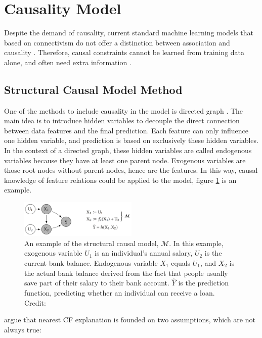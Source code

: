 \section{Causality Model}\label{sec:Causality}
Despite the demand of causality, current standard machine learning models that based on connectivism do not offer a distinction between association and causality \cite{diffThatMakesDiff}. Therefore, causal constraints cannot be learned from training data alone, and often need extra information \cite{bookCausality,preservingCausal}.
\subsection{Structural Causal Model Method}
One of the methods to include causality in the model is directed graph \cite{algorithmicrecourse}. The main idea is to introduce hidden variables to decouple the direct connection between data features and the final prediction. Each feature can only influence one hidden variable, and prediction is based on exclusively these hidden variables. In the context of a directed graph, these hidden variables are called endogenous variables because they have at least one parent node. Exogenous variables are those root nodes without parent nodes, hence are the features. In this way, causal knowledge of feature relations could be applied to the model, figure \ref{fig:directedGraph} is an example.
\begin{figure}
  \centering
  \includegraphics[width=0.5\textwidth]{directedGraph.PNG}
  \caption{An example of the structural causal model, $\mathcal{M}$. In this example, exogenous variable $U_1$ is an individual's annual salary, $U_2$ is the current bank balance. Endogenous variable $X_1$ equals $U_1$, and $X_2$ is the actual bank balance derived from the fact that people usually save part of their salary to their bank account. $\hat Y$ is the prediction function, predicting whether an individual can receive a loan. Credit:\cite{algorithmicrecourse}}
  \label{fig:directedGraph}
\end{figure}

\citeauthor{algorithmicrecourse} \cite{algorithmicrecourse} argue that nearest CF explanation is founded on two assumptions, which are not always true:

